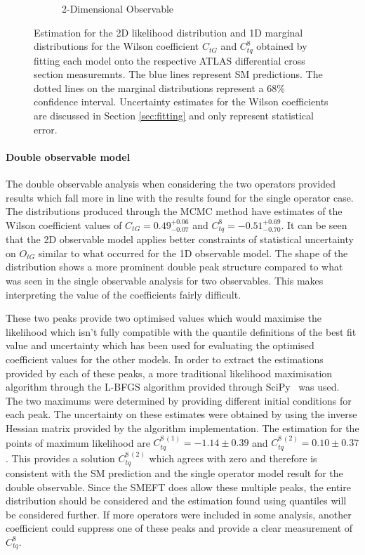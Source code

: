 \documentclass[a4paper,11pt]{article}
\begin{document}
\begin{figure}[htb]
\begin{subfigure}[b]{0.45\textwidth}
        \caption{2-Dimensional Observable}
        \label{fig:corner_2D_2OP}
    \end{subfigure}
    \centering
    \caption{Estimation for the 2D likelihood distribution and 1D marginal distributions for the Wilson coefficient $C_{tG}$ and $C_{tq}^{8}$ obtained by fitting each model onto the respective ATLAS differential cross section measuremnts. The blue lines represent SM predictions. The dotted lines on the marginal distributions represent a 68\% confidence interval. Uncertainty estimates for the Wilson coefficients are discussed in Section \ref{sec:fitting} and only represent statistical error.}
    \label{fig:corner_2OP}
\end{figure}

\paragraph{Double observable model}

The double observable analysis when considering the two operators provided results which fall more in line with the results found for the single operator case.
The distributions produced through the MCMC method have estimates of the Wilson coefficient values of $C_{tG}=0.49_{-0.07}^{+0.06}$ and $C_{tq}^{8}=-0.51_{-0.70}^{+0.69}$.
It can be seen that the 2D observable model applies better constraints of statistical uncertainty on $O_{tG}$ similar to what occurred for the 1D observable model.
The shape of the distribution shows a more prominent double peak structure compared to what was seen in the single observable analysis for two observables.
This makes interpreting the value of the coefficients fairly difficult. 

These two peaks provide two optimised values which would maximise the likelihood which isn't fully compatible with the quantile definitions of the best fit value and uncertainty which has been used for evaluating the optimised coefficient values for the other models.
In order to extract the estimations provided by each of these peaks, a more traditional likelihood maximisation algorithm through the L-BFGS algorithm provided through SciPy~\cite{2020SciPy-NMeth} was used.
The two maximums were determined by providing different initial conditions for each peak.
The uncertainty on these estimates were obtained by using the inverse Hessian matrix provided by the algorithm implementation.
The estimation for the points of maximum likelihood are $C_{tq}^{8\,(1)}=-1.14\pm0.39$ and $C_{tq}^{8\,(2)}=0.10\pm0.37$.
This provides a solution $C_{tq}^{8\,(2)}$ which agrees with zero and therefore is consistent with the SM prediction and the single operator model result for the double observable.
Since the SMEFT does allow these multiple peaks, the entire distribution should be considered and the estimation found using quantiles will be considered further.
If more operators were included in some analysis, another coefficient could suppress one of these peaks and provide a clear measurement of $C_{tq}^{8}$.
\end{document}
